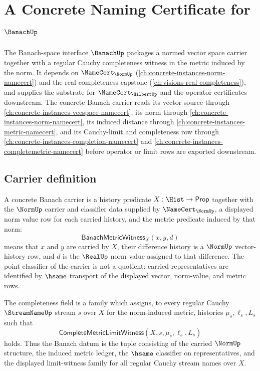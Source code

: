 \chapter{A Concrete Naming Certificate for $\BanachUp$}
\label{ch:concrete-instances-banach-namecert}

The Banach-space interface $\BanachUp$ packages a normed vector space carrier together with a regular Cauchy completeness witness in the metric induced by the norm. It depends on $\NameCert_{\NormUp}$ (\autoref{ch:concrete-instances-norm-namecert}) and the real-completeness capstone (\autoref{ch:visions-real-completeness}), and supplies the substrate for $\NameCert_{\HilbertUp}$ and the operator certificates downstream. The concrete Banach carrier reads its vector source through \autoref{ch:concrete-instances-vecspace-namecert}, its norm through \autoref{ch:concrete-instances-norm-namecert}, its induced distance through \autoref{ch:concrete-instances-metric-namecert}, and its Cauchy-limit and completeness row through \autoref{ch:concrete-instances-completion-namecert} and \autoref{ch:concrete-instances-completemetric-namecert} before operator or limit rows are exported downstream.

\section{Carrier definition}
\label{sec:banach-carrier}

\begin{definition}\label{def:banach-concrete-carrier}
A concrete Banach carrier is a history predicate $X:\Hist\to\mathsf{Prop}$
together with the $\NormUp$ carrier and classifier data supplied by
$\NameCert_{\NormUp}$, a displayed norm value row for each carried history,
and the metric predicate induced by that norm:
$$
\mathsf{BanachMetricWitness}_X(x,y,d)
$$
means that $x$ and $y$ are carried by $X$, their difference history is a
$\NormUp$ vector-history row, and $d$ is the $\RealUp$ norm value assigned to
that difference. The point classifier of the carrier is not a quotient:
carried representatives are identified by $\hsame$ transport of the displayed
vector, norm-value, and metric rows.

The completeness field is a family which assigns, to every regular Cauchy
$\StreamNameUp$ stream $s$ over $X$ for the norm-induced metric, histories
$\mu_s,\ell_s,L_s$ such that
$$
\mathsf{CompleteMetricLimitWitness}(X,s,\mu_s,\ell_s,L_s)
$$
holds. Thus the Banach datum is the tuple consisting of the carried
$\NormUp$ structure, the induced metric ledger, the $\hsame$ classifier on
representatives, and the displayed limit-witness family for all regular
Cauchy stream names over $X$.
\end{definition}

